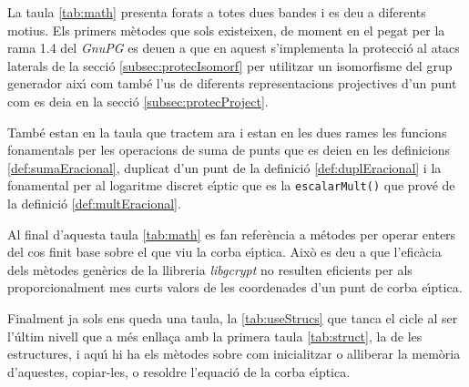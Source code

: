 \documentclass[12pt,twoside,catalan,a4paper]{book}%
\numberwithin{figure}{section}		%
\theoremstyle{definition}   			%
\def\ce{corba e\lgem{}\'{\i}ptica}%
\def\cf{cos finit}%
\theoremstyle{saltolinea}   			%
\begin{document}
La taula \ref{tab:math} presenta forats a totes dues bandes i es deu a diferents motius. Els primers m\`etodes que sols existeixen, de moment en el pegat per la rama 1.4 del \emph{GnuPG} es deuen a que en aquest s'implementa la protecci\'o al atacs laterals de la secci\'o \ref{subsec:protecIsomorf} per utilitzar un isomorfisme del grup generador aix\'{\i} com tamb\'e l'us de diferents representacions projectives d'un punt com es deia en la secci\'o \ref{subsec:protecProject}.

Tamb\'e estan en la taula que tractem ara i estan en les dues rames les funcions fonamentals per les operacions de suma de punts que es deien en les definicions \ref{def:sumaEracional}, duplicat d'un punt de la definici\'o \ref{def:duplEracional} i la fonamental per al logaritme discret e\lgem{}\'{\i}ptic que es la {\tt escalarMult()} que prov\'e de la definici\'o \ref{def:multEracional}.

Al final d'aquesta taula \ref{tab:math} es fan refer\`encia a m\'etodes per operar enters del \cf{} base sobre el que viu la \ce{}. Aix\`o es deu a que l'efic\`acia dels m\`etodes gen\`erics de la llibreria \emph{libgcrypt} no resulten eficients per als proporcionalment mes curts valors de les coordenades d'un punt de \ce{}.

Finalment ja sols ens queda una taula, la \ref{tab:useStrucs} que tanca el cicle al ser l'\'ultim nivell que a m\'es enlla\c{c}a amb la primera taula \ref{tab:struct}, la de les estructures, i aqu\'{\i} hi ha els m\`etodes sobre com inicialitzar o alliberar la mem\`oria d'aquestes, copiar-les, o resoldre l'equaci\'o de la \ce{}.

\lstset{language=C,basicstyle=\footnotesize,breaklines=true}
\end{document}
